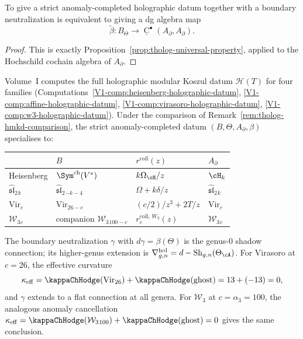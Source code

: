 \begin{proposition}
To give a strict anomaly-completed holographic datum together with a boundary neutralization is equivalent to giving a dg algebra map
\[
\widetilde\beta:B_{\Theta}\longrightarrow \underline{\operatorname{C}}^{\bullet}(A_{\partial},A_{\partial}).
\]
\end{proposition}

\begin{proof}
This is exactly Proposition~\ref{prop:tholog-universal-property}, applied to the Hochschild cochain algebra of \(A_{\partial}\).
\end{proof}

\begin{remark}
Volume~I computes the full holographic modular Koszul datum
$\mathcal{H}(T)$ for four families
(Computations~\ref*{V1-comp:heisenberg-holographic-datum},
\ref*{V1-comp:affine-holographic-datum},
\ref*{V1-comp:virasoro-holographic-datum},
\ref*{V1-comp:w3-holographic-datum}).
Under the comparison of
Remark~\ref{rem:tholog-hmkd-comparison}, the strict
anomaly-completed datum $(B,\Theta,A_\partial,\beta)$
specialises to:
\begin{center}
\renewcommand{\arraystretch}{1.15}
\begin{tabular}{llll}
& $B$ & $r^{\mathrm{coll}}(z)$ & $A_\partial$ \\
\hline
Heisenberg & $\Sym^{\mathrm{ch}}(V^*)$ & $k\Omega_{\cH}/z$ & $\cH_k$ \\
$\widehat{\mathfrak{sl}}_2{}_k$
 & $\widehat{\mathfrak{sl}}_2{}_{-k-4}$
 & $\Omega + k\delta/z$
 & $\widehat{\mathfrak{sl}}_2{}_k$ \\
$\mathrm{Vir}_c$
 & $\mathrm{Vir}_{26-c}$
 & $(c/2)/z^3+2T/z$
 & $\mathrm{Vir}_c$ \\
$\mathcal W_3{}_c$
 & companion $\mathcal W_3{}_{100-c}$
 & $r_c^{\mathrm{coll},\,W_3}(z)$
 & $\mathcal W_3{}_c$
\end{tabular}
\end{center}
The boundary neutralization $\gamma$ with
$d\gamma=\beta(\Theta)$ is the genus-$0$ shadow connection;
its higher-genus extension is
$\nabla^{\mathrm{hol}}_{g,n}=d-\mathrm{Sh}_{g,n}(\Theta_\cA)$.
For Virasoro at $c=26$, the effective curvature
\[
\kappa_{\mathrm{eff}}
=\kappaChHodge(\mathrm{Vir}_{26})+\kappaChHodge(\mathrm{ghost})
=13+(-13)=0,
\]
and $\gamma$ extends to a flat connection at all genera.
For $\mathcal W_3$ at $c=\alpha_3=100$, the analogous anomaly
cancellation $\kappa_{\mathrm{eff}}=\kappaChHodge(\mathcal W_3{}_{100})
+\kappaChHodge(\mathrm{ghost})=0$ gives the same conclusion.
\end{remark}

